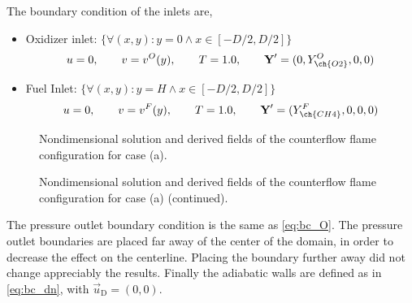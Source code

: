 The boundary condition of the inlets are,
\begin{itemize}
	\item Oxidizer inlet: $\{\forall (x,y): y = 0 \land x \in [-D/2, D/2]\}$\\
	\begin{equation*}
		u = 0,\qquad v= v^O(y), \qquad T = 1.0, \qquad \vec{Y}' = (0,Y^O_{\ch{O2}},0,0)
	\end{equation*}
	\item Fuel Inlet: $\{\forall (x,y): y = H \land x \in [-D/2, D/2]\} $ \\
	\begin{equation*}
		u = 0,\qquad v= v^F(y), \qquad T = 1.0, \qquad \vec{Y}' = (Y^F_{\ch{CH4}},0,0,0)
	\end{equation*}
\end{itemize}
 
\begin{figure}[p]
	\centering
	\pgfplotsset{width=0.73\textwidth, compat=1.3}
	\caption{Nondimensional solution and derived fields of the counterflow flame configuration for case (a).} \label{fig:CoFlowFlameFig1}
\end{figure}
\begin{figure}[p]
	\ContinuedFloat
	\centering
	\pgfplotsset{width=0.73\textwidth, compat=1.3}		
	\caption{Nondimensional solution and derived fields of the counterflow flame configuration for case (a) (continued).}%
\end{figure} 


The pressure outlet boundary condition is the same as \cref{eq:bc_O}. The pressure outlet boundaries are placed far away of the center of the domain, in order to decrease the effect on the centerline. Placing the boundary further away did not change appreciably the results. Finally the adiabatic walls are defined as in \cref{eq:bc_dn}, with $\vec{u}_{\text{D}} = (0,0)$.          
 
